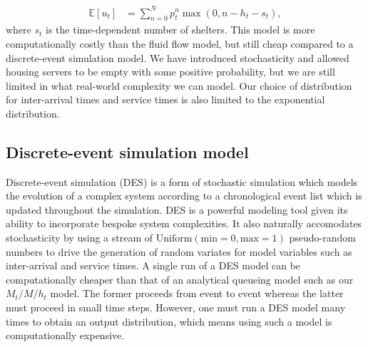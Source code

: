 \documentclass[12pt,a4paper]{article}
\begin{document}
%
\begin{align} \label{u_t_mmt}
\mathbb{E}[u_t] & = \sum_{n=0}^{N} p^n_t \max(0,n-h_t-s_t), 
\end{align}
%
where $s_t$ is the time-dependent number of shelters. This model is more computationally costly than the fluid flow model, but still cheap compared to a discrete-event simulation model. We have introduced stochasticity and allowed housing servers to be empty with some positive probability, but we are still limited in what real-world complexity we can model. Our choice of distribution for inter-arrival times and service times is also limited to the exponential distribution. 
%
\subsection{Discrete-event simulation model} \label{DES}
%
Discrete-event simulation (DES) is a form of stochastic simulation which models the evolution of a complex system according to a chronological event list which is updated throughout the simulation. DES is a powerful modeling tool given its ability to incorporate bespoke system complexities. It also naturally accomodates stochasticity by using a stream of $\text{Uniform}(\text{min} = 0, \text{max} = 1)$ pseudo-random numbers to drive the generation of random variates for model variables such as inter-arrival and service times. A single run of a DES model can be computationally cheaper than that of an analytical queueing model such as our $M_t/M/h_t$ model. The former proceeds from event to event whereas the latter must proceed in small time steps. However, one must run a DES model many times to obtain an output distribution, which means using such a model is computationally expensive.
\end{document}
